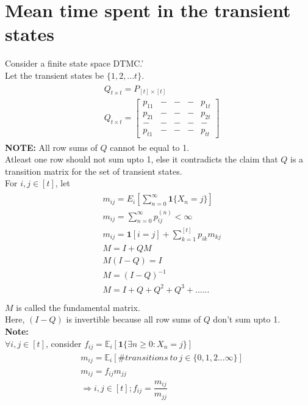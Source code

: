 \documentclass[a4paper,10pt,english]{article}
\begin{document}
\section{Mean time spent in the transient states}
Consider a finite state space DTMC.'\\
Let the transient states be $\{1,2,...t\}$.\\
\begin{eqnarray*}
	\begin{aligned}
	&	Q_{t \times t} = P_{[t] \times [t]}\\
	&	Q_{t \times t} = \begin{bmatrix} p_{11}&-&-&-&p_{1t}\\ p_{21}&-&-&-&p_{2t} \\ -&-&-&-&-\\ p_{t1}&-&-&-&p_{tt} \end{bmatrix}
    \end{aligned}
\end{eqnarray*}
\textbf{NOTE:} All row sums of $Q$ cannot be equal to 1.\\
Atleast one row should not sum upto 1, else it contradicts the claim that $Q$ is a transition matrix for the set of transient states.\\
For $i,j \in [t]$, let\\
\begin{eqnarray*}
	\begin{aligned}
& m_{ij} = E_i[\sum_{n=0}^{\infty} \textbf{1} \{X_n = j\}]\\
& m_{ij} = \sum_{n=0}^{\infty} p_{ij}^{(n)} < \infty\\
& m_{ij} = \textbf{1}[i = j] + \sum_{k=1}^{[t]} p_{ik}m_{kj} \\
& M = I + QM\\
& M(I - Q) = I\\
& M = (I - Q)^{-1}\\
& M = I + Q + Q^{2} + Q^{3} + ......\\
    \end{aligned}
\end{eqnarray*}
$M$ is called the fundamental matrix.\\
Here, $(I - Q)$ is invertible because all row sums of $Q$ don't sum upto 1.\\
\textbf{Note:}\\
$\forall i,j \in [t]$, consider $f_{ij} = \mathbb{E}_i[\textbf{1} \{\exists n \geq 0: X_n = j \}]$\\
\begin{eqnarray*}
\begin{aligned}
& m_{ij} = \mathbb{E}_i[\# transitions\ to\ j \in \{0,1,2...\infty\}]\\
& m_{ij} = f_{ij} m_{jj}\\
&\Rightarrow i,j \in [t]; f_{ij} = \dfrac{m_{ij}}{m_{jj}}
\end{aligned}
\end{eqnarray*}
 
\end{document}
